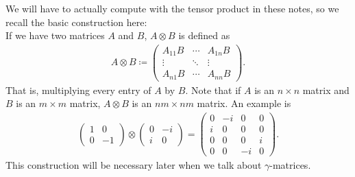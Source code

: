 \documentclass[11pt]{article}
\begin{document}
\begin{nnote}
    We will have to actually compute with the tensor product in these
    notes, so we recall the basic construction here:\\

    \noin
    If we have two matrices $A$ and $B$, $A \otimes B$
    is defined as
    \begin{align*}
        A \otimes B \coloneqq \begin{pmatrix}
            A_{11} B & \cdots & A_{1n} B\\
            \vdots & \ddots & \vdots\\
            A_{n1} B & \cdots & A_{nn} B
        \end{pmatrix}.
    \end{align*}
    That is, multiplying every entry of $A$ by $B$.
    Note that if $A$ is an $n \times n$ matrix and
    $B$ is an $m \times m$ matrix, $A \otimes B$
    is an $nm \times nm$ matrix.
    An example is
    \begin{align*}
        \begin{pmatrix}
            1 & 0\\
            0 & -1
        \end{pmatrix}
        \otimes
        \begin{pmatrix}
            0 & -i\\
            i & 0
        \end{pmatrix}
        = \begin{pmatrix}
            0 & -i & 0 & 0\\
            i & 0 & 0 & 0\\
            0 & 0 & 0 & i\\
            0 & 0 & - i & 0
        \end{pmatrix}.
    \end{align*}
    This construction will be necessary later when we talk about
    $\gamma$-matrices.
\end{nnote}
\end{document}
